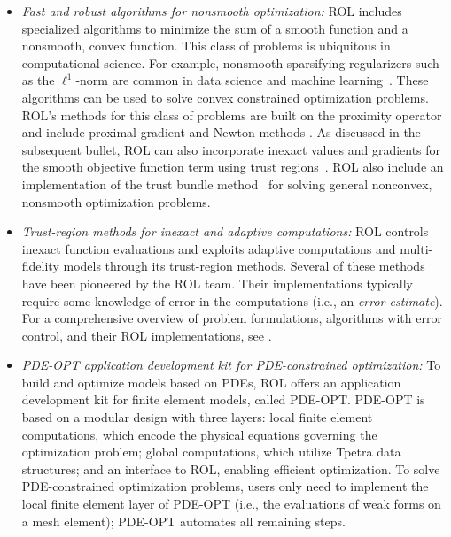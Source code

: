 \begin{itemize}
probabilistic functions, and robust problem formulations. To approximate
stochastic problems~\cite{shapiro2021lectures}, ROL includes sample-based
approaches such as sample average approximation, stochastic approximation, and
adaptive sparse-grid quadrature~\cite{kouri2013trust,kouri2014inexact}. ROL
also includes specialized algorithms such as progressive hedging~\cite{rockafellar1991scenarios}
and the primal-dual risk minimization algorithm~\cite{kouri2022primal}.
\item
\emph{Fast and robust algorithms for nonsmooth optimization:}
ROL includes specialized algorithms to minimize the sum of a smooth function
and a nonsmooth, convex function.  This class of problems is ubiquitous in
computational science.  For example, nonsmooth sparsifying regularizers such as
the $\ell^1$-norm are common in data science and machine learning~\cite{fuhg2024extreme}.
These algorithms can be used to solve convex constrained optimization problems.
ROL's methods for this class of problems are built on the proximity operator
and include proximal gradient and Newton methods
\cite{beck2017first,kanzow2021globalized,ochs2014iPiano}.
As discussed in the subsequent bullet, ROL can also incorporate inexact
values and gradients for the smooth objective function term using trust regions~\cite{baraldi2023proximal}.
ROL also include an implementation of the trust bundle method~\cite{schramm1992bundle}
for solving general nonconvex, nonsmooth optimization problems.
\item
\emph{Trust-region methods for inexact and adaptive computations:}
ROL controls inexact function evaluations and exploits adaptive computations
and multi-fidelity models through its trust-region methods. Several of these methods
have been pioneered by the ROL team.  Their implementations typically require some
knowledge of error in the computations (i.e., an \emph{error estimate}).
For a comprehensive overview of problem formulations, algorithms with error control,
and their ROL implementations, see \cite{Kouri2018}.
\item
\emph{PDE-OPT application development kit for PDE-constrained optimization:}
To build and optimize models based on PDEs,
ROL offers an application development kit for finite element models, called PDE-OPT.
PDE-OPT is based on a modular design with three layers: local finite element computations,
which encode the physical equations governing the optimization problem;
global computations, which utilize Tpetra data structures;
and an interface to ROL, enabling efficient optimization.
To solve PDE-constrained optimization problems, users only need to implement the
local finite element layer of PDE-OPT (i.e., the evaluations of weak forms on
a mesh element); PDE-OPT automates all remaining steps.
\end{itemize}

